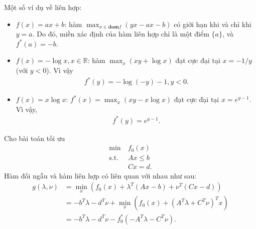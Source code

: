 \documentclass{book}
\begin{document}
Một số ví dụ về liên hợp:
\begin{itemize}
\item $f(x) = ax + b$: hàm $\max_{x \in \mathbf{dom} f} (yx - ax - b)$ có giới hạn khi và chỉ khi $y = a$. Do đó, miền xác định của hàm liên hợp chỉ là một điểm $\{a\}$, và $f^*(a) = -b$.

\item $f(x) = -\log x, x \in \mathbb{R}$: hàm $\max_x (xy + \log x)$ đạt cực đại tại $x = -1/y$ (với $y < 0$). 
Vì vậy
\begin{align*}
f^*(y) = -\log(-y) - 1, y<0.
\end{align*}

\item $f(x) = x \log x$: $f^*(x) = \max_x (xy - x \log x)$ đạt cực đại tại $x = e^{y-1}$. Vì vậy,
\begin{align*}
f^*(y) = e^{y-1}.
\end{align*}


\end{itemize}

Cho bài toán tối ưu
\begin{align*}
\mathrm{min~} & f_0(x) \\
\mathrm{s.t.~} & Ax \leq b \\
			& Cx = d.
\end{align*}
Hàm đối ngẫu và hàm liên hợp có liên quan với nhau như sau:
\begin{align*}
g(\lambda, \nu) &= \min_x(f_0(x) + \lambda^T(Ax - b) + \nu ^T(Cx - d)) \\
			& = -b^T \lambda - d^T \nu + \min_{x}(f_0(x) + (A^T \lambda + C^T \nu)^T x) \\
			& = -b^T \lambda - d^T \nu - f^*_0(- A^T \lambda - C^T \nu).
\end{align*}
\end{document}

